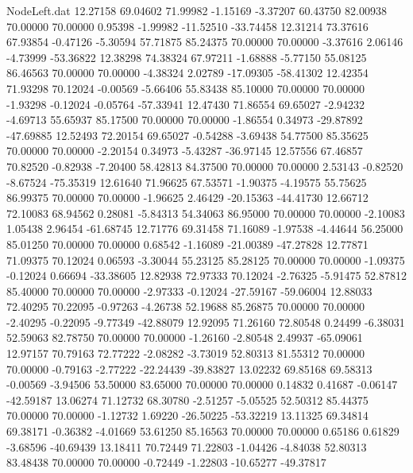 \begin{filecontents}{NodeLeft.dat}
  12.27158   69.04602   71.99982    -1.15169   -3.37207   60.43750   82.00938   70.00000   70.00000    0.95398   -1.99982  -11.52510  -33.74458
  12.31214   73.37616   67.93854    -0.47126   -5.30594   57.71875   85.24375   70.00000   70.00000   -3.37616    2.06146   -4.73999  -53.36822
  12.38298   74.38324   67.97211    -1.68888   -5.77150   55.08125   86.46563   70.00000   70.00000   -4.38324    2.02789  -17.09305  -58.41302
  12.42354   71.93298   70.12024    -0.00569   -5.66406   55.83438   85.10000   70.00000   70.00000   -1.93298   -0.12024   -0.05764  -57.33941
  12.47430   71.86554   69.65027    -2.94232   -4.69713   55.65937   85.17500   70.00000   70.00000   -1.86554    0.34973  -29.87892  -47.69885
  12.52493   72.20154   69.65027    -0.54288   -3.69438   54.77500   85.35625   70.00000   70.00000   -2.20154    0.34973   -5.43287  -36.97145
  12.57556   67.46857   70.82520    -0.82938   -7.20400   58.42813   84.37500   70.00000   70.00000    2.53143   -0.82520   -8.67524  -75.35319
  12.61640   71.96625   67.53571    -1.90375   -4.19575   55.75625   86.99375   70.00000   70.00000   -1.96625    2.46429  -20.15363  -44.41730
  12.66712   72.10083   68.94562     0.28081   -5.84313   54.34063   86.95000   70.00000   70.00000   -2.10083    1.05438    2.96454  -61.68745
  12.71776   69.31458   71.16089    -1.97538   -4.44644   56.25000   85.01250   70.00000   70.00000    0.68542   -1.16089  -21.00389  -47.27828
  12.77871   71.09375   70.12024     0.06593   -3.30044   55.23125   85.28125   70.00000   70.00000   -1.09375   -0.12024    0.66694  -33.38605
  12.82938   72.97333   70.12024    -2.76325   -5.91475   52.87812   85.40000   70.00000   70.00000   -2.97333   -0.12024  -27.59167  -59.06004
  12.88033   72.40295   70.22095    -0.97263   -4.26738   52.19688   85.26875   70.00000   70.00000   -2.40295   -0.22095   -9.77349  -42.88079
  12.92095   71.26160   72.80548     0.24499   -6.38031   52.59063   82.78750   70.00000   70.00000   -1.26160   -2.80548    2.49937  -65.09061
  12.97157   70.79163   72.77222    -2.08282   -3.73019   52.80313   81.55312   70.00000   70.00000   -0.79163   -2.77222  -22.24439  -39.83827
  13.02232   69.85168   69.58313    -0.00569   -3.94506   53.50000   83.65000   70.00000   70.00000    0.14832    0.41687   -0.06147  -42.59187
  13.06274   71.12732   68.30780    -2.51257   -5.05525   52.50312   85.44375   70.00000   70.00000   -1.12732    1.69220  -26.50225  -53.32219
  13.11325   69.34814   69.38171    -0.36382   -4.01669   53.61250   85.16563   70.00000   70.00000    0.65186    0.61829   -3.68596  -40.69439
  13.18411   70.72449   71.22803    -1.04426   -4.84038   52.80313   83.48438   70.00000   70.00000   -0.72449   -1.22803  -10.65277  -49.37817

\end{filecontents}
